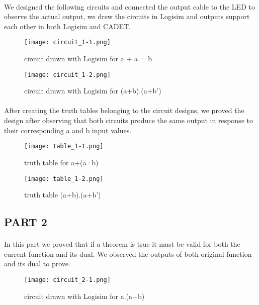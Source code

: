 \documentclass[pdftex,12pt,a4paper]{article}
\begin{document}
\begin{flushleft}
\paragraph{}
We designed the following circuits and connected the output cable to the LED to observe the actual output, we drew the circuits in Logisim and outputs support each other in both Logisim and CADET.
\end{flushleft}
\begin{figure}[H]
    \centering
    \texttt{[image: circuit\_1-1.png]}
	\caption{circuit drawn with Logisim for a + a · b}
    \label{fig1}
\end{figure}
\begin{figure}[H]
    \centering
    \texttt{[image: circuit\_1-2.png]}
	\caption{circuit drawn with Logisim for (a+b).(a+b')}
	\label{fig2}
\end{figure}
\begin{flushleft} %
\paragraph{}
After creating the truth tables belonging to the circuit designs, we proved the design after observing that both circuits produce the same output in response to their corresponding  a and b input values.
\end{flushleft}
\begin{figure}[H]
    \centering
    \texttt{[image: table\_1-1.png]}
	\caption{truth table for  a+(a·b)}
    \label{tbl1}
\end{figure}

\begin{figure}[H]
    \centering
    \texttt{[image: table\_1-2.png]}
	\caption{truth table (a+b).(a+b')}
	\label{tbl2}
\end{figure}


\begin{flushleft}
\subsection{PART 2}
\end{flushleft}

\begin{flushleft} %
\paragraph{}
In this part we proved that if a theorem is true it must be valid for both the current function and its dual. We observed the outputs of both original function and its dual to prove.
\end{flushleft}
\begin{figure}[H]
    \centering
    \texttt{[image: circuit\_2-1.png]}
	\caption{circuit drawn with Logisim for a.(a+b)}
	\label{fig3}
\end{figure}
\end{document}
